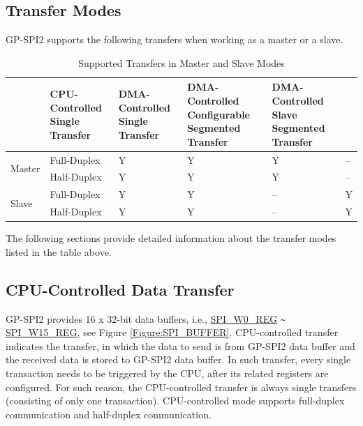 \documentclass[main\_\_EN.tex]{subfiles}
\begin{document}
\subsection{Transfer Modes}

GP-SPI2 supports the following transfers when working as a master or a slave.

\begin{table}[H]
    \centering
    \caption{Supported Transfers in Master and Slave Modes}
    \label{tab:transfer-modes}
    \begin{threeparttable}
    \begin{tabular}{|l|l|p{2.5cm}<{\centering}|p{2.5cm}<{\centering}|p{3.3cm}<{\centering}|p{3.3cm}<{\centering}| }
    \hline
        \rowcolor{lightgray}
        \multicolumn{2}{l|}{\textbf{Mode}}  & \textbf{CPU-Controlled Single Transfer}  & \textbf{DMA-Controlled Single Transfer} &   \textbf{DMA-Controlled Configurable Segmented Transfer}    & \textbf{DMA-Controlled Slave Segmented Transfer} \\\hline
    \multirow{2}{*}{Master} & Full-Duplex & Y & Y & Y & --\\\cline{2-6}

    & Half-Duplex & Y & Y & Y & --\\\hline

    \multirow{2}{*}{Slave} & Full-Duplex & Y & Y & -- &Y \\\cline{2-6}
    & Half-Duplex & Y & Y & -- &Y \\\hline
        \end{tabular}
     \end{threeparttable}
    \end{table}

The following sections provide detailed information about the transfer modes listed in the table above.

\subsection{CPU-Controlled Data Transfer}\label{sec:cpu-controlled-data-transfer}
GP-SPI2 provides 16 x 32-bit data buffers, i.e., \hyperref[regdesc:SPIW0REG]{SPI\_W0\_REG} \verb+~+ \hyperref[regdesc:SPIW15REG]{SPI\_W15\_REG}, see Figure \ref{Figure:SPI_BUFFER}.
CPU-controlled transfer indicates the transfer, in which the data to send is from GP-SPI2 data buffer and the received data is stored to GP-SPI2 data buffer.
In such transfer, every single transaction needs to be triggered by the CPU, after its related registers are configured. For such reason, the CPU-controlled transfer is always single transfers (consisting of only one transaction). CPU-controlled mode supports full-duplex communication and half-duplex communication.
\end{document}
